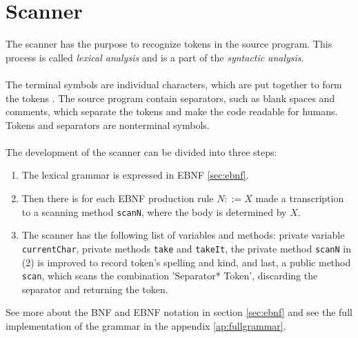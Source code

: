 \section{Scanner}
\label{sec:scannertheory}
The scanner has the purpose to recognize tokens in the source program. This process is called \textit{lexical analysis} and is a part of the \textit{syntactic analysis}.
\\
\\
The terminal symbols are individual characters, which are put together to form the tokens \cite{misc:spo}. The source program contain separators, such as blank spaces and comments, which separate the tokens and make the code readable for humans. Tokens and separators are nonterminal symbols.
\\
\\
The development of the scanner can be divided into three steps:
\begin{enumerate}
\item The lexical grammar is expressed in EBNF \ref{sec:ebnf}.
\item Then there is for each EBNF production rule $N::=X$ made a transcription to a scanning method \texttt{scanN}, where the body is determined by $X$.
\item The scanner has the following list of variables and methods: private variable \texttt{currentChar}, private methods \texttt{take} and \texttt{takeIt}, the private method \texttt{scanN} in (2) is improved to record token's spelling and kind, and last, a public method \texttt{scan}, which scans the combination 'Separator* Token', discarding the separator and returning the token.
\end{enumerate}

See more about the BNF and EBNF notation in section \ref{sec:ebnf} and see the full implementation of the grammar in the appendix \ref{ap:fullgrammar}.